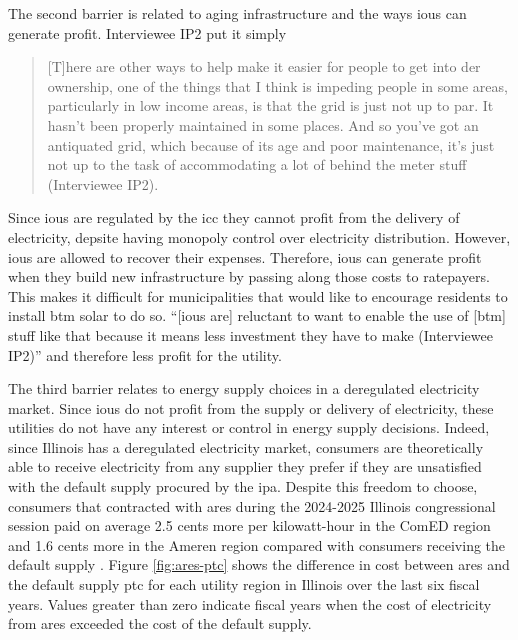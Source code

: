 The second barrier is related to aging infrastructure and the ways \acp{iou} can
generate profit. Interviewee IP2 put it simply
\begin{quote}
     [T]here are other ways to help make it easier for people to get into
     \acs{der} ownership, one of the things that I think is impeding people in
     some areas, particularly in low income areas, is that the grid is just not
     up to par. It hasn't been properly maintained in some places. And so you've
     got an antiquated grid, which because of its age and poor maintenance, it's
     just not up to the task of accommodating a lot of behind the meter stuff
     (Interviewee IP2).
\end{quote}
Since \acfp{iou} are regulated by the \ac{icc} they cannot profit from the
delivery of electricity, depsite having monopoly control over electricity
distribution. However, \acp{iou} are allowed to recover their expenses.
Therefore, \acp{iou} can generate profit when they build new infrastructure by
passing along those costs to ratepayers. This makes it difficult for
municipalities that would like to encourage residents to install \ac{btm} solar
to do so. ``[\acp{iou} are] reluctant to want to enable the use of [\ac{btm}]
stuff like that because it means less investment they have to make (Interviewee
IP2)'' and therefore less profit for the utility.

The third barrier relates to energy supply choices in a deregulated electricity
market. Since \acp{iou} do not profit from the supply or delivery of
electricity, these utilities do not have any interest or control in energy
supply decisions. Indeed, since Illinois has a deregulated electricity market,
consumers are theoretically able to receive electricity from any supplier they
prefer if they are unsatisfied with the default supply procured by the \ac{ipa}.
Despite this freedom to choose, consumers that contracted with \ac{ares} during
the 2024-2025 Illinois congressional session paid on average 2.5 cents more per
kilowatt-hour in the ComED region and 1.6 cents more in the Ameren region
compared with consumers receiving the default supply
\cite{office_of_retail_market_development_2025_2025}. Figure \ref{fig:ares-ptc}
shows the difference in cost between \ac{ares} and the default supply \ac{ptc}
for each utility region in Illinois over the last six fiscal years. Values greater than
zero indicate fiscal years when the cost of electricity from \ac{ares} exceeded the
cost of the default supply.

